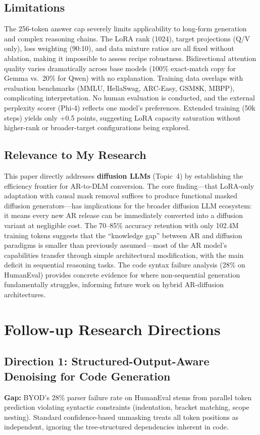 \documentclass[11pt,a4paper]{article}
\begin{document}
\subsection{Limitations}
The 256-token answer cap severely limits applicability to long-form generation and complex reasoning chains. The LoRA rank (1024), target projections (Q/V only), loss weighting (90:10), and data mixture ratios are all fixed without ablation, making it impossible to assess recipe robustness. Bidirectional attention quality varies dramatically across base models (100\% exact-match copy for Gemma vs.\ 20\% for Qwen) with no explanation. Training data overlaps with evaluation benchmarks (MMLU, HellaSwag, ARC-Easy, GSM8K, MBPP), complicating interpretation. No human evaluation is conducted, and the external perplexity scorer (Phi-4) reflects one model's preferences. Extended training (50k steps) yields only +0.5 points, suggesting LoRA capacity saturation without higher-rank or broader-target configurations being explored.

\subsection{Relevance to My Research}
This paper directly addresses \textbf{diffusion LLMs} (Topic~4) by establishing the efficiency frontier for AR-to-DLM conversion. The core finding---that LoRA-only adaptation with causal mask removal suffices to produce functional masked diffusion generators---has implications for the broader diffusion LLM ecosystem: it means every new AR release can be immediately converted into a diffusion variant at negligible cost. The 70--85\% accuracy retention with only 102.4M training tokens suggests that the ``knowledge gap'' between AR and diffusion paradigms is smaller than previously assumed---most of the AR model's capabilities transfer through simple architectural modification, with the main deficit in sequential reasoning tasks. The code syntax failure analysis (28\% on HumanEval) provides concrete evidence for where non-sequential generation fundamentally struggles, informing future work on hybrid AR-diffusion architectures.

\section{Follow-up Research Directions}

\subsection{Direction 1: Structured-Output-Aware Denoising for Code Generation}
\textbf{Gap:} BYOD's 28\% parser failure rate on HumanEval stems from parallel token prediction violating syntactic constraints (indentation, bracket matching, scope nesting). Standard confidence-based unmasking treats all token positions as independent, ignoring the tree-structured dependencies inherent in code.
\end{document}
